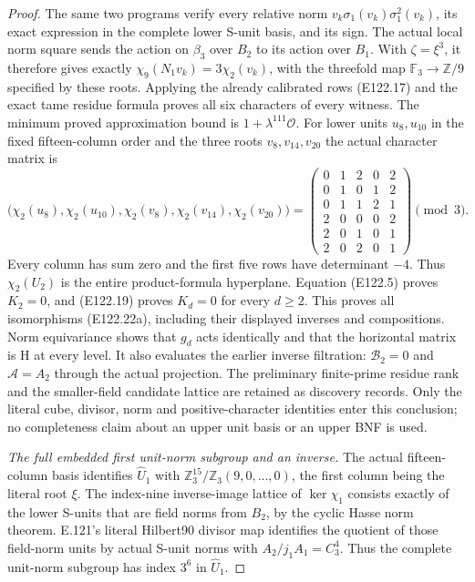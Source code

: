 \begin{proof}
The same two programs verify every relative norm
$v_k\sigma_1(v_k)\sigma_1^2(v_k)$, its exact expression in the
complete lower S-unit basis, and its sign. The actual local norm
square sends the action on $\beta_3$ over $B_2$ to its action over
$B_1$. With $\zeta=\xi^3$, it therefore gives exactly
$\chi_9(N_1v_k)=3\chi_2(v_k)$, with the threefold map
$\mathbb F_3\to\mathbb Z/9$ specified by these roots.
Applying the already calibrated rows (E122.17) and the exact tame
residue formula proves all six characters of every witness. The
minimum proved approximation bound is $1+\lambda^{111}\mathcal O$.
For lower units $u_8,u_{10}$ in the fixed fifteen-column order and
the three roots $v_8,v_{14},v_{20}$ the actual character matrix is
\[
 \bigl(\chi_2(u_8),\chi_2(u_{10}),
        \chi_2(v_8),\chi_2(v_{14}),\chi_2(v_{20})\bigr)
 =\begin{pmatrix}
 0&1&2&0&2\\0&1&0&1&2\\0&1&1&2&1\\
 2&0&0&0&2\\2&0&1&0&1\\2&0&2&0&1
 \end{pmatrix}\pmod3.
 \tag{E122.22}
\]
Every column has sum zero and the first five rows have determinant
$-4$. Thus $\chi_2(U_2)$ is the entire product-formula hyperplane.
Equation (E122.5) proves $K_2=0$, and (E122.19) proves $K_d=0$
for every $d\ge2$. This proves all isomorphisms (E122.22a), including
their displayed inverses and compositions. Norm equivariance shows
that $g_d$ acts identically and that the horizontal matrix is H at
every level. It also evaluates the earlier inverse filtration:
$\mathcal B_2=0$ and $\mathcal A=A_2$ through the actual projection.
The preliminary finite-prime residue rank and the smaller-field
candidate lattice are retained as discovery records. Only the
literal cube, divisor, norm and positive-character identities enter
this conclusion; no completeness claim about an upper unit basis
or an upper BNF is used.

\emph{The full embedded first unit-norm subgroup and an inverse.}
The actual fifteen-column basis identifies $\widehat U_1$ with
$\mathbb Z_3^{15}/\mathbb Z_3(9,0,\ldots,0)$, the first column
being the literal root $\xi$. The index-nine inverse-image lattice
of $\ker\chi_1$ consists exactly of the lower S-units that are
field norms from $B_2$, by the cyclic Hasse norm theorem. E.121's
literal Hilbert90 divisor map identifies the quotient of those
field-norm units by actual S-unit norms with $A_2/j_1A_1=C_3^4$.
Thus the complete unit-norm subgroup has index $3^6$ in $\widehat U_1$.


\end{proof}
